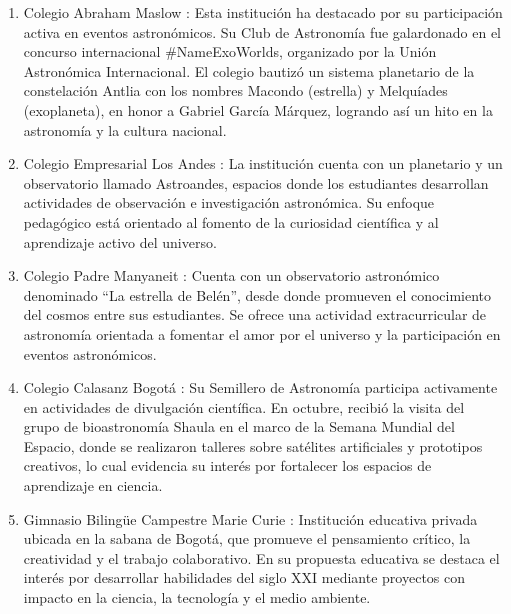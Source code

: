 \begin{enumerate}
  \item Colegio Abraham Maslow \cite{maslowweb}:
    Esta institución ha destacado por su participación activa en eventos
    astronómicos.
    Su Club de Astronomía fue galardonado en el concurso internacional
    \#NameExoWorlds, organizado por la Unión Astronómica Internacional.
    El colegio bautizó un sistema planetario de la constelación Antlia con los
    nombres Macondo (estrella) y Melquíades (exoplaneta), en honor a Gabriel
    García Márquez, logrando así un hito en la astronomía y la cultura nacional.

  \item Colegio Empresarial Los Andes \cite{astroandes}:
    La institución cuenta con un planetario y un observatorio llamado
    Astroandes, espacios donde los estudiantes desarrollan actividades de
    observación e investigación astronómica.
    Su enfoque pedagógico está orientado al fomento de la curiosidad científica
    y al aprendizaje activo del universo.

  \item Colegio Padre Manyaneit \cite{manyanetweb}:
    Cuenta con un observatorio astronómico
    denominado ``La estrella de Belén'', desde donde promueven el conocimiento
    del cosmos entre sus estudiantes.
    Se ofrece una actividad extracurricular de astronomía orientada a fomentar
    el amor por el universo y la participación en eventos astronómicos.

  \item Colegio Calasanz Bogotá \cite{calasanzastro}:
    Su Semillero de Astronomía participa activamente en actividades de
    divulgación científica.
    En octubre, recibió la visita del grupo de bioastronomía Shaula en el marco
    de la Semana Mundial del Espacio, donde se realizaron talleres sobre
    satélites artificiales y prototipos creativos, lo cual evidencia su interés
    por fortalecer los espacios de aprendizaje en ciencia.

  \item Gimnasio Bilingüe Campestre Marie Curie \cite{mariecurieweb}:
    Institución educativa privada ubicada en la sabana de Bogotá, que promueve
    el pensamiento crítico, la creatividad y el trabajo colaborativo.
    En su propuesta educativa se destaca el interés por desarrollar habilidades
    del siglo XXI mediante proyectos con impacto en la ciencia, la tecnología y
    el medio ambiente.
\end{enumerate}

